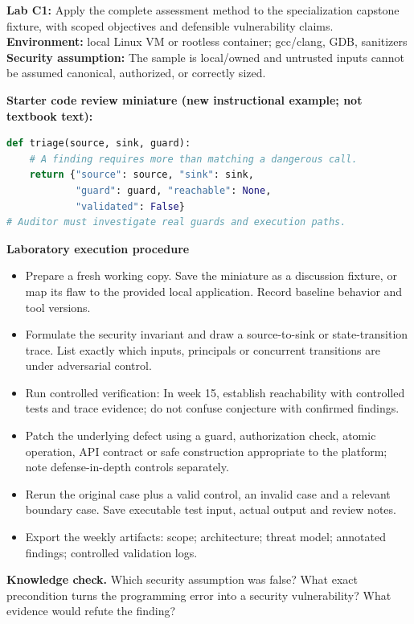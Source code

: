 \documentclass[10pt,letterpaper]{article}
\begin{document}
\begin{insight}\textbf{Lab C1:} Apply the complete assessment method to the specialization capstone fixture, with scoped objectives and defensible vulnerability claims.\\\textbf{Environment:} local Linux VM or rootless container; gcc/clang, GDB, sanitizers\\\textbf{Security assumption:} The sample is local/owned and untrusted inputs cannot be assumed canonical, authorized, or correctly sized.\end{insight}
\textbf{Starter code review miniature (new instructional example; not textbook text):}
\begin{lstlisting}[language=Python]
def triage(source, sink, guard):
    # A finding requires more than matching a dangerous call.
    return {"source": source, "sink": sink,
            "guard": guard, "reachable": None,
            "validated": False}
# Auditor must investigate real guards and execution paths.
\end{lstlisting}
\textbf{Laboratory execution procedure}
\begin{itemize}[leftmargin=*,itemsep=2pt]
\item Prepare a fresh working copy. Save the miniature as a discussion fixture, or map its flaw to the provided local application. Record baseline behavior and tool versions.
\item Formulate the security invariant and draw a source-to-sink or state-transition trace. List exactly which inputs, principals or concurrent transitions are under adversarial control.
\item Run controlled verification: In week 15, establish reachability with controlled tests and trace evidence; do not confuse conjecture with confirmed findings.
\item Patch the underlying defect using a guard, authorization check, atomic operation, API contract or safe construction appropriate to the platform; note defense-in-depth controls separately.
\item Rerun the original case plus a valid control, an invalid case and a relevant boundary case. Save executable test input, actual output and review notes.
\item Export the weekly artifacts: scope; architecture; threat model; annotated findings; controlled validation logs.
\end{itemize}
\textbf{Knowledge check.} Which security assumption was false? What exact precondition turns the programming error into a security vulnerability? What evidence would refute the finding?
\end{document}
